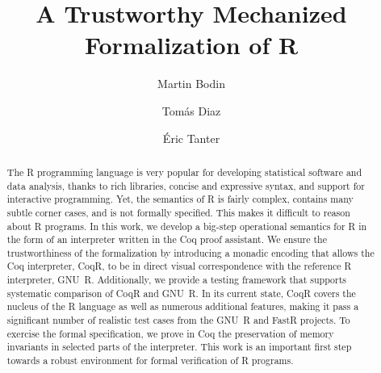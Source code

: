 \documentclass[
    sigplan,
    10pt,
    review, %
    natbib=false %
 ]{acmart}
\newcommand\CoqR{CoqR}
\begin{document}
\title{A Trustworthy Mechanized Formalization of R}

\author{Martin Bodin}

\author{Tom{\'a}s Diaz}

\author{{\'E}ric Tanter}

\begin{abstract}
The R programming language is very popular for developing statistical software and data analysis, thanks to rich libraries, concise and expressive syntax, and support for interactive programming. Yet, the semantics of R is fairly complex, contains many subtle corner cases, and is not formally specified. This makes it difficult to reason about R programs. In this work, we develop a big-step operational semantics for R in the form of an interpreter written in the Coq proof assistant. We ensure the trustworthiness of the formalization by introducing a monadic encoding that allows the Coq interpreter, \CoqR, to be in direct visual correspondence with the reference R interpreter, GNU~R. Additionally, we provide a testing framework that supports systematic comparison of \CoqR{} and GNU~R. In its current state, \CoqR{} covers the nucleus of the R language as well as numerous additional features, making it pass a significant number of realistic test cases from the GNU~R and FastR projects. To exercise the formal specification, we prove in Coq the preservation of memory invariants in selected parts of the interpreter. This work is an important first step towards a robust environment for
formal verification of R programs.
\end{abstract}
\end{document}
